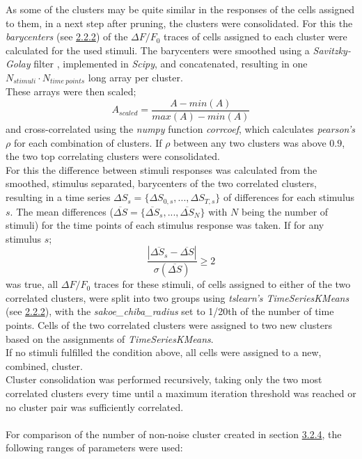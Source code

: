 \documentclass[12pt, a4paper, oneside]{article}
\begin{document}
As some of the clusters may be quite similar in the responses of the cells assigned to them, in a next step after pruning, the clusters were consolidated. For this the \textit{barycenters} (see \hyperref[sec:dtw trials]{2.2.2}) of the $\Delta F/F_0$ traces of cells assigned to each cluster were calculated for the used stimuli. The barycenters were smoothed using a \textit{Savitzky-Golay} filter \parencite{savitzkySmoothingDifferentiationData1964}, implemented in \textit{Scipy}, and concatenated, resulting in one $N_{stimuli} \cdot N_{time\ points}$ long array per cluster.\\
These arrays were then scaled;
\[
A_{scaled} = \frac{A - min(A)}{max(A) - min(A)}
\]
and cross-correlated using the \textit{numpy} \parencite{harrisArrayProgrammingNumPy2020} function \textit{corrcoef}, which calculates \textit{pearson's} $\rho$ for each combination of clusters. If $\rho$ between any two clusters was above $0.9$, the two top correlating clusters were consolidated.\\
For this the difference between stimuli responses was calculated from the smoothed, stimulus separated, barycenters of the two correlated clusters, resulting in a time series
$\Delta S_s = \{\Delta S_{0,s},...,\Delta S_{T,s}\}$ of differences for each stimulus $s$. The mean differences
($\overline{\Delta S} = \{\overline{\Delta S}_{s},	...,\overline{\Delta S}_{N}\}$ with $N$ being the number of stimuli) for the time points of each stimulus response was taken. If for any stimulus $s$;
\[
\frac{|\overline{\Delta S_s} - \overline{\Delta S}|}{\sigma(\overline{\Delta S})} \geq 2
\]
was true, all $\Delta F/F_0$ traces for these stimuli, of cells assigned to either of the two correlated clusters, were split into two groups using \textit{tslearn's TimeSeriesKMeans} (see \hyperref[sec:dtw trials]{2.2.2}), with the \textit{sakoe\_chiba\_radius} set to 1/20th of the number of time points. Cells of the two correlated clusters were assigned to two new clusters based on the assignments of \textit{TimeSeriesKMeans}.\\
If no stimuli fulfilled the condition above, all cells were assigned to a new, combined, cluster.\\
Cluster consolidation was performed recursively, taking only the two most correlated clusters every time until a maximum iteration threshold was reached or no cluster pair was sufficiently correlated.\\
\\
For comparison of the number of non-noise cluster created in section \hyperref[sec:num clusters]{3.2.4}, the following ranges of parameters were used:
\end{document}
